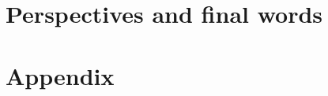 
\part{Perspectives and final words}


\cleardoublepage


\appendix

\part{Appendix}


\cleardoublepage

\cleardoublepage

\cleardoublepage

\clearpage




